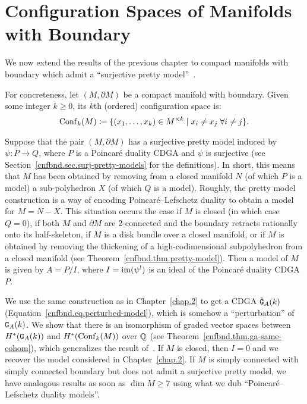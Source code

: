 \chapter{Configuration Spaces of Manifolds with Boundary}
\label{chap.3}

We now extend the results of the previous chapter to compact manifolds with boundary which admit a ``surjective pretty model''~\cite{CordovaBulensLambrechtsStanley2015}.

For concreteness, let $(M, \partial M)$ be a compact manifold with boundary.
Given some integer $k \ge 0$, its $k$th (ordered) configuration space is:
\[ \operatorname{Conf}_{k}(M) \coloneqq \{ (x_{1}, \dots, x_{k}) \in M^{\times k} \mid x_{i} \neq x_{j} \; \forall i \neq j \}. \]

Suppose that the pair $(M, \partial M)$ has a surjective pretty model induced by $\psi : P \to Q$, where $P$ is a Poincaré duality CDGA and $\psi$ is surjective (see Section~\ref{cnfbnd.sec.surj-pretty-models} for the definitions).
In short, this means that $M$ has been obtained by removing from a closed manifold $N$ (of which $P$ is a model) a sub-polyhedron $X$ (of which $Q$ is a model).
Roughly, the pretty model construction is a way of encoding Poincaré--Lefschetz duality to obtain a model for $M = N - X$.
This situation occurs the case if $M$ is closed (in which case $Q = 0$), if both $M$ and $\partial M$ are $2$-connected and the boundary retracts rationally onto its half-skeleton, if $M$ is a disk bundle over a closed manifold, or if $M$ is obtained by removing the thickening of a high-codimensional subpolyhedron from a closed manifold (see Theorem~\ref{cnfbnd.thm.pretty-model}).
Then a model of $M$ is given by $A = P/I$, where $I = \operatorname{im}(\psi^{!})$ is an ideal of the Poincaré duality CDGA $P$.

We use the same construction as in Chapter~\ref{chap.2} to get a CDGA $\tilde{\mathtt{G}}_{A}(k)$ (Equation~\eqref{cnfbnd.eq.perturbed-model}), which is somehow a ``perturbation'' of $\mathtt{G}_{A}(k)$.
We show that there is an isomorphism of graded vector spaces between $H^{*}(\mathtt{G}_{A}(k))$ and $H^{*}(\operatorname{Conf}_{k}(M))$ over $\mathbb{Q}$ (see Theorem~\ref{cnfbnd.thm.ga-same-cohom}), which generalizes the result of~\cite{LambrechtsStanley2008a}.
If $M$ is closed, then $I = 0$ and we recover the model considered in Chapter~\ref{chap.2}.
If $M$ is simply connected with simply connected boundary but does not admit a surjective pretty model, we have analogous results as soon as $\dim M \geq 7$ using what we dub ``Poincaré--Lefschetz duality models''.

